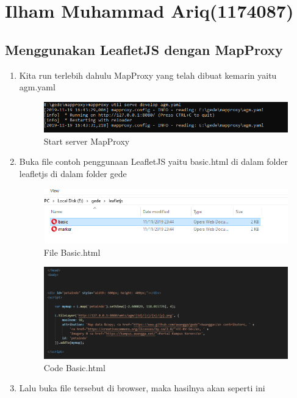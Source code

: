 \section{Ilham Muhammad Ariq(1174087)}
\subsection{Menggunakan LeafletJS dengan MapProxy}
\begin{enumerate}
    \item Kita run terlebih dahulu MapProxy yang telah dibuat kemarin yaitu agm.yaml
    \hfill\break
    \begin{figure}[H]
		\includegraphics[width=12cm]{figures/Tugas5/1174087/1.png}
		\centering
		\caption{Start server MapProxy}
	\end{figure}
    \item Buka file contoh penggunaan LeafletJS yaitu basic.html di dalam folder leafletjs di dalam folder gede
    \hfill\break
    \begin{figure}[H]
		\includegraphics[width=12cm]{figures/Tugas5/1174087/2.png}
		\centering
		\caption{File Basic.html}
	\end{figure}
	\begin{figure}[H]
		\includegraphics[width=12cm]{figures/Tugas5/1174087/7.png}
		\centering
		\caption{Code Basic.html}
	\end{figure}
    \item Lalu buka file tersebut di browser, maka hasilnya akan seperti ini
    \hfill\break
    \begin{figure}[H]

\end{figure}
\end{enumerate}
